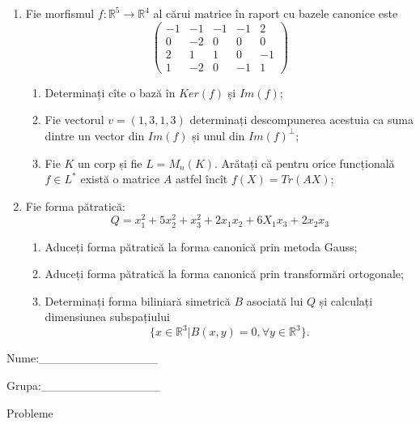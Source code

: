 \documentclass{article}
\begin{document}
\begin{enumerate}
 \item Fie morfismul $f:\mathbb{R}^5 \to \mathbb{R}^4$ al cărui matrice în raport cu bazele canonice este
$$\begin{pmatrix}
-1&-1&-1&-1&2\\
0&-2&0&0&0\\
2&1&1&0&-1\\
1&-2&0&-1&1
\end{pmatrix}$$

\begin{enumerate}
\item Determinați cîte o bază în $Ker(f)$ și $Im(f)$;
\item Fie vectorul $v=(1,3,1,3)$ determinați descompunerea acestuia ca suma dintre un vector din $Im(f)$ și unul din $Im(f)^\perp$;
\item Fie $K$ un corp și fie $L=M_n(K)$. Arătați că pentru orice funcțională $f \in L^*$ există o matrice $A$ astfel încît $f(X)=Tr(AX)$;
\end{enumerate}
\item Fie forma pătratică:
$$Q= x_1^2+5x_2^2+x_3^2+2x_1x_2+6X_1x_3+2x_2x_3$$

\begin{enumerate}
\item Aduceți forma pătratică la forma canonică prin metoda Gauss;
\item Aduceți forma pătratică la forma canonică prin transformări ortogonale;
\item Determinați forma biliniară simetrică $B$ asociată lui $Q$ și calculați dimensiunea subspațiului
$$\{x \in \mathbb{R}^3 | B(x,y)=0,\forall y \in \mathbb{R}^3\}.$$

\end{enumerate}
\end{enumerate}
\newpage
\begin{flushright}
Nume:\_\_\_\_\_\_\_\_\_\_\_\_\_\_
 
 
Grupa:\_\_\_\_\_\_\_\_\_\_\_\_\_\_
\end{flushright}
\begin{center}
\vspace{2cm}
{\Large Probleme}
\vspace{2cm}
\end{center}
\end{document}
